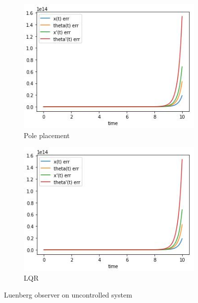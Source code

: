\documentclass[12pt,letterpaper]{article}
\begin{document}
        \begin{figure}[htb]
        \begin{subfigure}{.5\textwidth}
            \centering
            \includegraphics[width=1\linewidth]{images/luenberg/L_pole_uncontrolled.jpg}
            \caption{Pole placement}
            \label{fig:luenberg_uncontrolled_pole}
        \end{subfigure}
        \begin{subfigure}{.5\textwidth}
          \centering
          \includegraphics[width=1\linewidth]{images/luenberg/L_lqr_uncontrolled.jpg}
          \caption{LQR}
        \label{fig:luenberg_uncontrolled_lqr}
        \end{subfigure}
    \caption{Luenberg observer on uncontrolled system}
    \label{fig:luenberg_uncontrolled}
    \end{figure}
\end{document}
